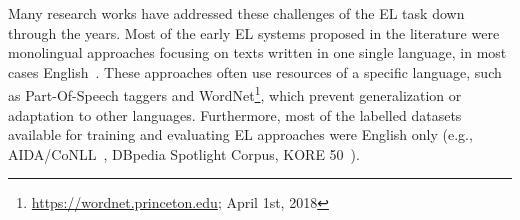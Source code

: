 \documentclass{llncs}
\begin{document}

 
Many research works have addressed these challenges of the EL task down through the years. Most of the early EL systems proposed in the literature were monolingual approaches focusing on texts written in one single language, in most cases English~\cite{mendes2011dbpedia,aida2011}. These approaches often use resources of a specific language, such as Part-Of-Speech taggers and WordNet\footnote{\url{https://wordnet.princeton.edu}; April 1st, 2018}, which prevent generalization or adaptation to other languages. Furthermore, most of the labelled datasets available for training and evaluating EL approaches were English only (e.g., AIDA/CoNLL~\cite{aida2011}, DBpedia Spotlight Corpus\cite{mendes2011dbpedia}, KORE 50~\cite{kore50}). 
\end{document}
